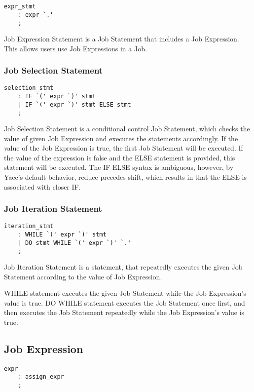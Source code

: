 \documentclass[prodmode,acmtecs]{acmsmall}
\begin{document}
\begin{lstlisting}
expr_stmt
	: expr `.'
	;
\end{lstlisting}

Job Expression Statement is a Job Statement that includes a Job
Expression.  This allows users use Job Expressions in a Job.

\subsubsection{Job Selection Statement}

\begin{lstlisting}
selection_stmt
	: IF `(' expr `)' stmt
	| IF `(' expr `)' stmt ELSE stmt
	;
\end{lstlisting}

Job Selection Statement is a conditional control Job Statement,
which checks the value of given Job Expression and executes the
statements accordingly.  If the value of the Job Expression is
true, the first Job Statement will be executed.  If the value of
the expression is false and the ELSE statement is provided, this
statement will be executed.  The IF ELSE syntax is ambiguous,
however, by Yacc's default behavior, reduce precedes shift, which
results in that the ELSE is associated with closer IF.

\subsubsection{Job Iteration Statement}

\begin{lstlisting}
iteration_stmt
	: WHILE `(' expr `)' stmt
	| DO stmt WHILE `(' expr `)' `.'
	;
\end{lstlisting}

Job Iteration Statement is a statement, that repeatedly executes
the given Job Statement according to the value of Job Expression.

WHILE statement executes the given Job Statement while the Job
Expression's value is true.  DO WHILE statement executes the Job
Statement once first, and then executes the Job Statement repeatedly
while the Job Expression's value is true.


\subsection{Job Expression}

\begin{lstlisting}
expr
	: assign_expr
	;
\end{lstlisting}
\end{document}
